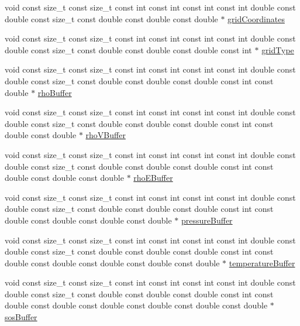 \begin{DoxyCompactItemize}
\item 
void const size\+\_\+t const size\+\_\+t const int const int const int const int double const double const size\+\_\+t const double const double const double $\ast$ \hyperlink{WENOKernels_8H_a55f433dcd5ee1a2b6a9d73ce18fcaa58}{grid\+Coordinates}
\item 
void const size\+\_\+t const size\+\_\+t const int const int const int const int double const double const size\+\_\+t const double const double const double const int $\ast$ \hyperlink{WENOKernels_8H_ab35a6cf312bb0fddda7097a149c3e946}{grid\+Type}
\item 
void const size\+\_\+t const size\+\_\+t const int const int const int const int double const double const size\+\_\+t const double const double const double const int const double $\ast$ \hyperlink{WENOKernels_8H_a7f8551332dfedc9c12724ab3903db88c}{rho\+Buffer}
\item 
void const size\+\_\+t const size\+\_\+t const int const int const int const int double const double const size\+\_\+t const double const double const double const int const double const double $\ast$ \hyperlink{WENOKernels_8H_aaddaafee4b407fa52d0756171ec50a51}{rho\+V\+Buffer}
\item 
void const size\+\_\+t const size\+\_\+t const int const int const int const int double const double const size\+\_\+t const double const double const double const int const double const double const double $\ast$ \hyperlink{WENOKernels_8H_a355f99edd58be395aedbe083ffca12b0}{rho\+E\+Buffer}
\item 
void const size\+\_\+t const size\+\_\+t const int const int const int const int double const double const size\+\_\+t const double const double const double const int const double const double const double const double $\ast$ \hyperlink{WENOKernels_8H_ad7fb6f5370938321db995446ba47c04b}{pressure\+Buffer}
\item 
void const size\+\_\+t const size\+\_\+t const int const int const int const int double const double const size\+\_\+t const double const double const double const int const double const double const double const double const double $\ast$ \hyperlink{WENOKernels_8H_a81c39e1ec75a82e2a4ece4c61c356f36}{temperature\+Buffer}
\item 
void const size\+\_\+t const size\+\_\+t const int const int const int const int double const double const size\+\_\+t const double const double const double const int const double const double const double const double const double const double $\ast$ \hyperlink{WENOKernels_8H_ad2e7242a5875e6d926fcdf5e83d45e41}{sos\+Buffer}

\end{DoxyCompactItemize}
